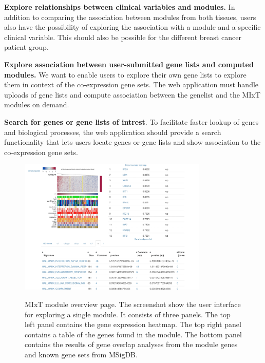 \textbf{Explore relationships between clinical variables and modules.} In
addition to comparing the association between modules from both tissues, users
also have the possibility of exploring the association with a module and a
specific clinical variable. This should also be possible for the different
breast cancer patient group. 

\textbf{Explore association between user-submitted gene lists and computed
modules.} We want to enable users to explore their own gene lists to explore
them in context of
the co-expression gene sets. The web application must handle uploads of gene
lists and compute association between the genelist and the MIxT modules on
demand. 

\textbf{Search for genes or gene lists of intrest}. To facilitate faster lookup
of genes and biological processes, the web application should provide a search
functionality that lets users locate genes or gene lists and show association to
the co-expression gene sets. 

\begin{figure}[h!]
\centering
\caption{MIxT module overview page. The screenshot show the user interface for
exploring a single module. It consists of three panels. The top left panel
contains the gene expression heatmap. The top right panel contains a table of
the genes found in the module. The bottom panel contains the results of gene
overlap analyses from the module genes and known gene sets from MSigDB.}
\includegraphics[width=0.8\textwidth]{figures/module.png}
\label{fig_first_case}
\end{figure} 

